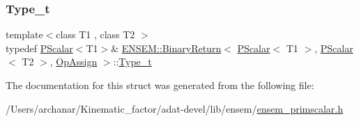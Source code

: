 \subsubsection{\texorpdfstring{Type\_t}{Type\_t}\hspace{0.1cm}{\footnotesize\ttfamily [3/3]}}
{\footnotesize\ttfamily template$<$class T1 , class T2 $>$ \\
typedef \mbox{\hyperlink{classENSEM_1_1PScalar}{P\+Scalar}}$<$T1$>$\& \mbox{\hyperlink{structENSEM_1_1BinaryReturn}{E\+N\+S\+E\+M\+::\+Binary\+Return}}$<$ \mbox{\hyperlink{classENSEM_1_1PScalar}{P\+Scalar}}$<$ T1 $>$, \mbox{\hyperlink{classENSEM_1_1PScalar}{P\+Scalar}}$<$ T2 $>$, \mbox{\hyperlink{structENSEM_1_1OpAssign}{Op\+Assign}} $>$\+::\mbox{\hyperlink{structENSEM_1_1BinaryReturn_3_01PScalar_3_01T1_01_4_00_01PScalar_3_01T2_01_4_00_01OpAssign_01_4_a3b0f260465f0e45413e2c6179d6cb397}{Type\+\_\+t}}}



The documentation for this struct was generated from the following file\+:\begin{DoxyCompactItemize}
\item 
/\+Users/archanar/\+Kinematic\+\_\+factor/adat-\/devel/lib/ensem/\mbox{\hyperlink{adat-devel_2lib_2ensem_2ensem__primscalar_8h}{ensem\+\_\+primscalar.\+h}}\end{DoxyCompactItemize}
